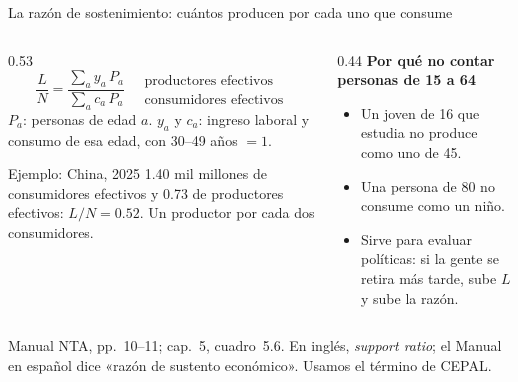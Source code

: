\documentclass[aspectratio=169,11pt]{beamer}
\newcommand{\fuente}[1]{\par\vfill{\small\color{cGris}#1\par}}
\begin{document}
\begin{frame}{La razón de sostenimiento: cuántos producen por cada uno que consume}
  \begin{columns}[T]
    \begin{column}{0.53\textwidth}
      \[
        \frac{L}{N}=\frac{\sum_a y_a\,P_a}{\sum_a c_a\,P_a}
        \quad
        \begin{array}{l}
          \text{productores efectivos}\\
          \text{consumidores efectivos}
        \end{array}
      \]
      $P_a$: personas de edad $a$. $y_a$ y $c_a$: ingreso laboral y consumo de esa edad, con 30--49 años $=1$.
      \par\medskip
      \pause
      \begin{block}{Ejemplo: China, 2025}
        1.40 mil millones de consumidores efectivos y 0.73 de productores efectivos: $L/N=0.52$. Un productor por cada dos consumidores.
      \end{block}
    \end{column}
    \begin{column}{0.44\textwidth}
      \pause
      \textbf{Por qué no contar personas de 15 a 64}
      \begin{itemize}
        \item Un joven de 16 que estudia no produce como uno de 45.
        \item Una persona de 80 no consume como un niño.
        \item Sirve para evaluar políticas: si la gente se retira más tarde, sube $L$ y sube la razón.
      \end{itemize}
    \end{column}
  \end{columns}
  \fuente{Manual NTA, pp.~10--11; cap.~5, cuadro~5.6. En inglés, \emph{support ratio}; el Manual en español dice «razón de sustento económico». Usamos el término de CEPAL.}
\end{frame}
\end{document}

